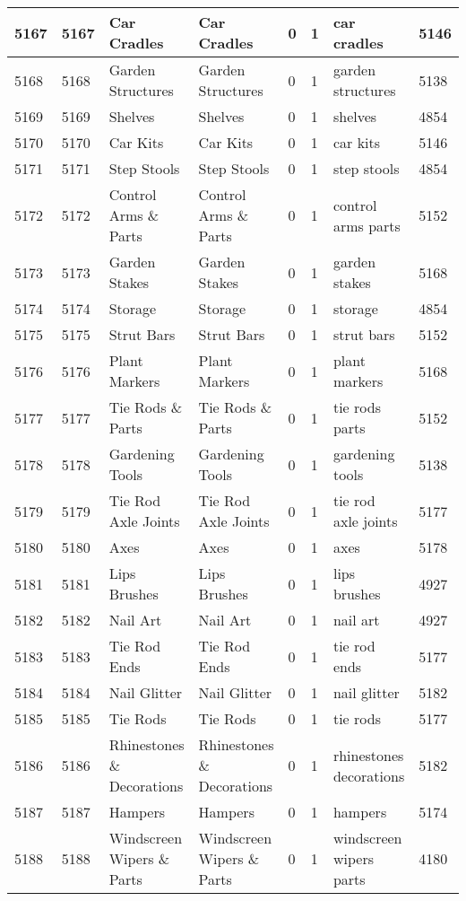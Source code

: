 \begin{longtable}{|l|l|l|l|l|l|l|l|}
5167 & 5167 & Car Cradles & Car Cradles & 0 & 1 & car cradles & 5146 \\ \hline 
5168 & 5168 & Garden Structures & Garden Structures & 0 & 1 & garden structures & 5138 \\ \hline 
5169 & 5169 & Shelves & Shelves & 0 & 1 & shelves & 4854 \\ \hline 
5170 & 5170 & Car Kits & Car Kits & 0 & 1 & car kits & 5146 \\ \hline 
5171 & 5171 & Step Stools & Step Stools & 0 & 1 & step stools & 4854 \\ \hline 
5172 & 5172 & Control Arms \& Parts & Control Arms \& Parts & 0 & 1 & control arms parts & 5152 \\ \hline 
5173 & 5173 & Garden Stakes & Garden Stakes & 0 & 1 & garden stakes & 5168 \\ \hline 
5174 & 5174 & Storage & Storage & 0 & 1 & storage & 4854 \\ \hline 
5175 & 5175 & Strut Bars & Strut Bars & 0 & 1 & strut bars & 5152 \\ \hline 
5176 & 5176 & Plant Markers & Plant Markers & 0 & 1 & plant markers & 5168 \\ \hline 
5177 & 5177 & Tie Rods \& Parts & Tie Rods \& Parts & 0 & 1 & tie rods parts & 5152 \\ \hline 
5178 & 5178 & Gardening Tools & Gardening Tools & 0 & 1 & gardening tools & 5138 \\ \hline 
5179 & 5179 & Tie Rod Axle Joints & Tie Rod Axle Joints & 0 & 1 & tie rod axle joints & 5177 \\ \hline 
5180 & 5180 & Axes & Axes & 0 & 1 & axes & 5178 \\ \hline 
5181 & 5181 & Lips Brushes & Lips Brushes & 0 & 1 & lips brushes & 4927 \\ \hline 
5182 & 5182 & Nail Art & Nail Art & 0 & 1 & nail art & 4927 \\ \hline 
5183 & 5183 & Tie Rod Ends & Tie Rod Ends & 0 & 1 & tie rod ends & 5177 \\ \hline 
5184 & 5184 & Nail Glitter & Nail Glitter & 0 & 1 & nail glitter & 5182 \\ \hline 
5185 & 5185 & Tie Rods & Tie Rods & 0 & 1 & tie rods & 5177 \\ \hline 
5186 & 5186 & Rhinestones \& Decorations & Rhinestones \& Decorations & 0 & 1 & rhinestones decorations & 5182 \\ \hline 
5187 & 5187 & Hampers & Hampers & 0 & 1 & hampers & 5174 \\ \hline 
5188 & 5188 & Windscreen Wipers \& Parts & Windscreen Wipers \& Parts & 0 & 1 & windscreen wipers parts & 4180 \\ \hline 

\end{longtable}
